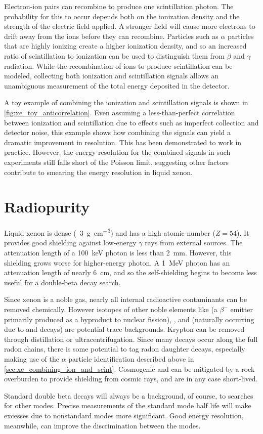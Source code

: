 \documentclass[herrin-thesis.tex]{subfiles}
\begin{document}
Electron-ion pairs can recombine to produce one scintillation photon. The probability for this to occur depends both on the ionization density and the strength of the electric field applied. A stronger field will cause more electrons to drift away from the ions before they can recombine. Particles such as \(\alpha\) particles that are highly ionizing create a higher ionization density, and so an increased ratio of scintillation to ionization can be used to distinguish them from \(\beta\) and \(\gamma\) radiation. While the recombination of ions to produce scintillation can be modeled\cite{Doke:1988qf}\cite{Thomas:1987ve}, collecting both ionization and scintillation signals allows an unambiguous measurement of the total energy deposited in the detector.

A toy example of combining the ionization and scintillation signals is shown in \cref{fig:xe_toy_anticorrelation}. Even assuming a less-than-perfect correlation between ionization and scintillation due to effects such as imperfect collection and detector noise, this example shows how combining the signals can yield a dramatic improvement in resolution. This has been demonstrated to work in practice\cite{Conti:2003tg}\cite{Aprile:2007hc}. However, the energy resolution for the combined signals in such experiments still falls short of the Poisson limit, suggesting other factors contribute to smearing the energy resolution in liquid xenon.

\section{Radiopurity}
Liquid xenon is dense (\about~\SI{3}{\g\per\cubic\cm}) and has a high atomic-number (\(Z=54\)). It provides good shielding against low-energy \(\gamma\) rays from external sources. The attenuation length of a \SI{100}{keV} photon is less than \SI{2}{\mm}\cite{Berger:2010dq}. However, this shielding grows worse for higher-energy photon. A \SI{1}{MeV} photon has an attenuation length of nearly \SI{6}{\cm}, and so the self-shielding begins to become less useful for a double-beta decay search.

Since xenon is a noble gas, nearly all internal radioactive contaminants can be removed chemically. However isotopes of other noble elements like  (a \(\beta^{-}\) emitter primarily produced as a byproduct to nuclear fission), , and  (naturally occurring due to  and  decays) are potential trace backgrounds. Krypton can be removed through distillation or ultracentrifugation. Since many decays occur along the full radon chains, there is some potential to tag radon daughter decays, especially making use of the \(\alpha\) particle identification described above in \cref{sec:xe_combining_ion_and_scint}. Cosmogenic  and  can be mitigated by a rock overburden to provide shielding from cosmic rays, and are in any case short-lived.

Standard double beta decays will always be a background, of course, to searches for other modes. Precise measurements of the standard mode half life will make excesses due to nonstandard modes more significant. Good energy resolution, meanwhile, can improve the discrimination between the modes.
\end{document}
